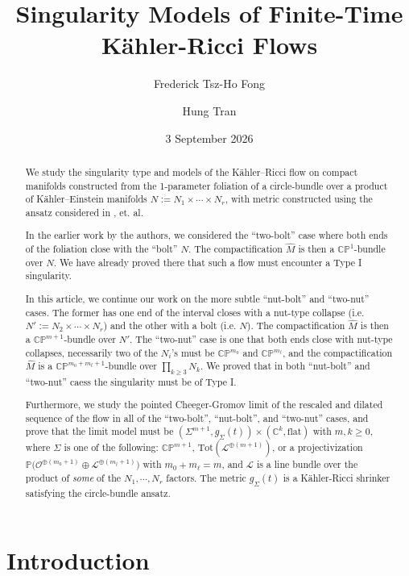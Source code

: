 \documentclass[11pt]{amsart}
\title{Singularity Models of Finite-Time K\"ahler-Ricci Flows}
\author{Frederick Tsz-Ho Fong}
\author{Hung Tran}
\date{3 September 2026}
\theoremstyle{plain}
\numberwithin{equation}{section}
\theoremstyle{definition}
\theoremstyle{remark}
\begin{document}
\begin{abstract}
We study the singularity type and models of the K\"ahler--Ricci flow on compact manifolds constructed from the 1-parameter foliation of a circle-bundle over a product of K\"ahler--Einstein manifolds $N := N_1 \times \cdots \times N_r$, with metric constructed using the ansatz considered in \cite{DW2011}, \cite{WW} et. al.

In the earlier work \cite{FT} by the authors, we considered the ``two-bolt'' case where both ends of the foliation close with the ``bolt'' $N$. The compactification $\widehat{M}$ is then a $\mathbb{CP}^1$-bundle over $N$. We have already proved there that such a flow must encounter a Type I singularity.

In this article, we continue our work on the more subtle ``nut-bolt'' and ``two-nut'' cases. The former has one end of the interval closes with a nut-type collapse (i.e. $N' := N_2 \times \cdots \times N_r$) and the other with a bolt (i.e. $N$). The compactification $\widehat{M}$ is then a $\mathbb{CP}^{m+1}$-bundle over $N'$.  The ``two-nut'' case is one that both ends close with nut-type collapses, necessarily two of the $N_i$'s must be $\mathbb{CP}^{m_0}$ and $\mathbb{CP}^{m_\ell}$, and the compactification $\widehat{M}$ is a $\mathbb{CP}^{m_0+m_\ell+1}$-bundle over $\prod_{k\geq 3}N_k$. We proved that in both ``nut-bolt'' and ``two-nut'' caess the singularity must be of Type I.

Furthermore, we study the pointed Cheeger-Gromov limit of the rescaled and dilated sequence of the flow in all of the ``two-bolt'', ``nut-bolt'', and ``two-nut'' cases, and prove that the limit model must be $(\Sigma^{m+1}, g_\Sigma(t)) \times (\mathbb{C}^{k}, \textrm{flat})$ with $m, k \geq 0$, where $\Sigma$ is one of the following: $\mathbb{CP}^{m+1}$, $\textrm{Tot}(\mathcal{L}^{\oplus(m+1)})$, or a projectivization $\mathbb{P}\big(\mathcal{O}^{\oplus(m_0+1)} \oplus \mathcal{L}^{\oplus(m_\ell+1)}\big)$ with $m_0 + m_\ell = m$, and $\mathcal{L}$ is a line bundle over the product of \emph{some} of the $N_1, \cdots, N_r$ factors. The metric $g_\Sigma(t)$ is a K\"ahler-Ricci shrinker satisfying the circle-bundle ansatz.

\end{abstract}

\maketitle
\section{Introduction}\label{sec:intro}
\end{document}
